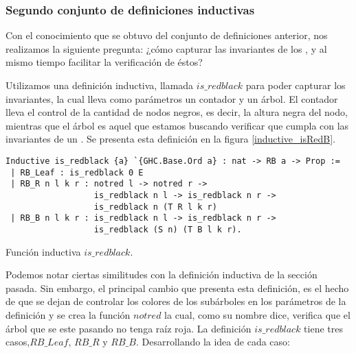\subsubsection{Segundo conjunto de definiciones inductivas}

Con el conocimiento que se obtuvo del conjunto de definiciones anterior, nos realizamos la
siguiente pregunta: ¿c\'omo capturar las invariantes de los {\arns}, y al mismo tiempo facilitar la
verificaci\'on de \'estos?

Utilizamos una definición inductiva, llamada \hyperref[inductive_isRedB]{$is\_redblack$} para poder 
capturar los invariantes, la cual lleva como parámetros un contador y un \'arbol. El contador lleva 
el control de la cantidad de nodos negros, es decir, la altura negra del nodo, mientras que el 
\'arbol es aquel que estamos buscando verificar que cumpla con las invariantes de un {\arn}. Se 
presenta esta definici\'on en la figura \ref{inductive_isRedB}.

\begin{listing}[!ht]
\centering
\captionsetup{justification=centering}
\begin{verbatim}
Inductive is_redblack {a} `{GHC.Base.Ord a} : nat -> RB a -> Prop :=
 | RB_Leaf : is_redblack 0 E
 | RB_R n l k r : notred l -> notred r ->
                  is_redblack n l -> is_redblack n r ->
                  is_redblack n (T R l k r)
 | RB_B n l k r : is_redblack n l -> is_redblack n r ->
                  is_redblack (S n) (T B l k r).
\end{verbatim}
\caption{Funci\'on inductiva $is\_redblack$.}
\label{inductive_isRedB}
\end{listing}

Podemos notar ciertas similitudes con la definición inductiva de la secci\'on pasada. Sin
embargo, el principal cambio que presenta esta definición, es el hecho de que se dejan de controlar
los colores de los subárboles en los parámetros de la definici\'on y se crea la funci\'on $notred$
la cual, como su nombre dice, verifica que el \'arbol que se este pasando no tenga raíz roja. La
definici\'on \hyperref[inductive_isRedB]{$is\_redblack$} tiene tres casos,$RB\_Leaf$, $RB\_R$ y 
$RB\_B$. Desarrollando la idea de cada caso:

